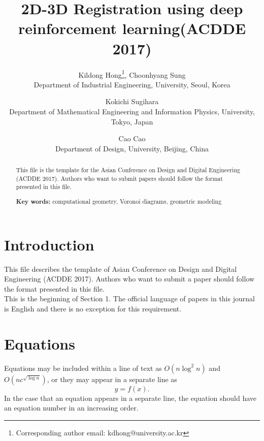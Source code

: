 \documentclass[10pt]{article}
\begin{document}
\title{2D-3D Registration using deep reinforcement learning(ACDDE 2017)}

\author{Kildong Hong\thanks{Corresponding author email: kdhong@university.ac.kr}, Choonhyang Sung
\\ Department of Industrial Engineering, University, Seoul, Korea
\and Kokichi Sugihara\\ Department of Mathematical Engineering and Information Physics, University, Tokyo, Japan
\and Cao Cao\\ Department of Design, University, Beijing, China}


%



\date{}
\maketitle

\begin{abstract}
This file is the template for the Asian Conference on Design and Digital Engineering (ACDDE 2017). Authors who want to submit papers should follow the format presented in this file.

\vspace*{5mm}
\noindent
{\bf Key words:}  computational geometry, Voronoi diagrams,
geometric modeling
\end{abstract}

\section{Introduction}
This file describes the template of Asian Conference on Design and Digital Engineering (ACDDE 2017). Authors who want to submit a paper should follow the format presented in this file.\\
This is the beginning of Section 1. The official language of papers in this journal is English and there is no exception for this requirement.


\section{Equations} %
Equations may be included within a line of text as $O(n \log ^2 n)$
and $O(nc^{\sqrt{\log n}})$, or they may appear in a separate line as
\begin{equation}
y = f(x).
\end{equation}
In the case that an equation appears in a separate line,
the equation should have an equation number in an increasing order.
\end{document}
